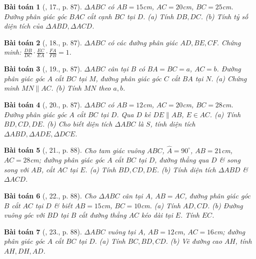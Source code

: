 \documentclass{article}
\newtheorem{baitoan}{Bài toán}
\begin{document}
\begin{baitoan}[\cite{SBT_Toan_8_tap_2}, 17., p. 87]
	$\Delta ABC$ có $AB = 15$\emph{cm}, $AC = 20$\emph{cm}, $BC = 25$\emph{cm}. Đường phân giác góc $BAC$ cắt cạnh $BC$ tại $D$. (a) Tính $DB,DC$. (b) Tính tỷ số diện tích của $\Delta ABD,\Delta ACD$.
\end{baitoan}

\begin{baitoan}[\cite{SBT_Toan_8_tap_2}, 18., p. 87]
	$\Delta ABC$ có các đường phân giác $AD,BE,CF$. Chứng minh: $\frac{DB}{DC}\cdot\frac{EC}{EA}\cdot\frac{FA}{FB} = 1$.
\end{baitoan}

\begin{baitoan}[\cite{SBT_Toan_8_tap_2}, 19., p. 87]
	$\Delta ABC$ cân tại $B$ có $BA = BC = a$, $AC = b$. Đường phân giác góc $A$ cắt $BC$ tại $M$, đường phân giác góc $C$ cắt $BA$ tại $N$. (a) Chứng minh $MN\parallel AC$. (b) Tính $MN$ theo $a,b$.
\end{baitoan}

\begin{baitoan}[\cite{SBT_Toan_8_tap_2}, 20., p. 87]
	$\Delta ABC$ có $AB = 12$\emph{cm}, $AC = 20$\emph{cm}, $BC = 28$\emph{cm}. Đường phân giác góc $A$ cắt $BC$ tại $D$. Qua $D$ kẻ $DE\parallel AB$, $E\in AC$. (a) Tính  $BD,CD,DE$. (b) Cho biết diện tích $\Delta ABC$ là $S$, tính diện tích $\Delta ABD,\Delta ADE,\Delta DCE$.
\end{baitoan}

\begin{baitoan}[\cite{SBT_Toan_8_tap_2}, 21., p. 88]
	Cho tam giác vuông $ABC$, $\widehat{A} = 90^\circ$, $AB = 21$\emph{cm}, $AC = 28$\emph{cm}; đường phân giác góc $A$ cắt $BC$ tại $D$, đường thẳng qua $D$ \& song song với $AB$, cắt $AC$ tại $E$. (a) Tính $BD,CD,DE$. (b) Tính diện tích $\Delta ABD$ \& $\Delta ACD$.
\end{baitoan}

\begin{baitoan}[\cite{SBT_Toan_8_tap_2}, 22., p. 88]
	Cho $\Delta ABC$ cân tại $A$, $AB = AC$, đường phân giác góc $B$ cắt $AC$ tại $D$ \& biết $AB = 15$\emph{cm}, $BC = 10$\emph{cm}. (a) Tính $AD,CD$. (b) Đường vuông góc với $BD$ tại $B$ cắt đường thẳng $AC$ kéo dài tại $E$. Tính $EC$.
\end{baitoan}

\begin{baitoan}[\cite{SBT_Toan_8_tap_2}, 23., p. 88]
	$\Delta ABC$ vuông tại $A$, $AB = 12$\emph{cm}, $AC = 16$\emph{cm}; đường phân giác góc $A$ cắt $BC$ tại $D$. (a) Tính $BC,BD,CD$. (b) Vẽ đường cao $AH$, tính $AH,DH,AD$.
\end{baitoan}
\end{document}
